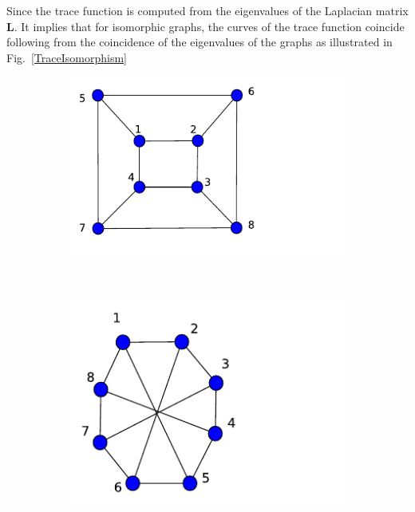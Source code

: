 \documentclass[10pt,a4paper]{article}
\begin{document}
        Since the trace function is computed from the eigenvalues of the Laplacian matrix $\mathbf{L}$. It implies that for isomorphic graphs, the curves of the trace function coincide following from the coincidence of the eigenvalues of the graphs as illustrated in Fig.~\ref{TraceIsomorphism}
        \begin{figure}[H]
        	\centering
        	\begin{subfigure}[b]{0.30\textwidth}
        		\includegraphics[width= \textwidth]{images/traceisomorphism2.pdf}
        		\caption{}
        		\label{isotracegraph1}
        	\end{subfigure}~
        	\begin{subfigure}[b]{0.30\textwidth}
        		\includegraphics[width= \textwidth]{images/traceisomorphism3.pdf}
        		\caption{}

\end{subfigure}
\end{figure}
\end{document}
